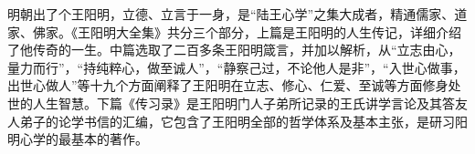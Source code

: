 \begin{book}[《王阳明大全集》]
    明朝出了个王阳明，立德、立言于一身，是“陆王心学”之集大成者，精通儒家、道家、佛家。《王阳明大全集》共分三个部分，上篇是王阳明的人生传记，详细介绍了他传奇的一生。中篇选取了二百多条王阳明箴言，并加以解析，从“立志由心，量力而行”，“持纯粹心，做至诚人”，“静察己过，不论他人是非”，“入世心做事，出世心做人”等十九个方面阐释了王阳明在立志、修心、仁爱、至诚等方面修身处世的人生智慧。下篇《传习录》是王阳明门人子弟所记录的王氏讲学言论及其答友人弟子的论学书信的汇编，它包含了王阳明全部的哲学体系及基本主张，是研习阳明心学的最基本的著作。
\end{book}
